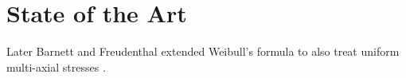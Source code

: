 \section{State of the Art}

Later Barnett \cite{barnett1978} and Freudenthal \cite{freudenthal1968} extended 
 Weibull's formula to also treat uniform multi-axial stresses \cite{lamon2016}. 